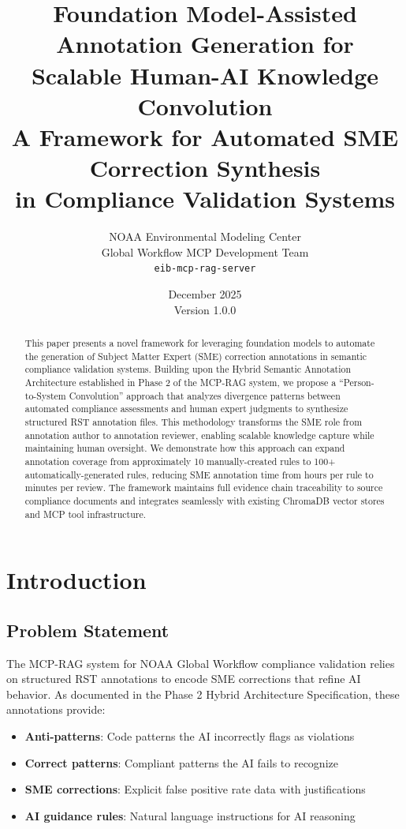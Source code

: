 \documentclass[11pt,a4paper]{article}
\title{%
    \vspace{-1cm}
    \textbf{Foundation Model-Assisted Annotation Generation for\\
    Scalable Human-AI Knowledge Convolution}\\[0.5cm]
    \large A Framework for Automated SME Correction Synthesis\\
    in Compliance Validation Systems
}
\author{
    NOAA Environmental Modeling Center\\
    Global Workflow MCP Development Team\\[0.3cm]
    \texttt{eib-mcp-rag-server}
}
\date{December 2025\\Version 1.0.0}
\begin{document}
\maketitle

\begin{abstract}
This paper presents a novel framework for leveraging foundation models to automate the generation of Subject Matter Expert (SME) correction annotations in semantic compliance validation systems. Building upon the Hybrid Semantic Annotation Architecture established in Phase 2 of the MCP-RAG system, we propose a ``Person-to-System Convolution'' approach that analyzes divergence patterns between automated compliance assessments and human expert judgments to synthesize structured RST annotation files. This methodology transforms the SME role from annotation author to annotation reviewer, enabling scalable knowledge capture while maintaining human oversight. We demonstrate how this approach can expand annotation coverage from approximately 10 manually-created rules to 100+ automatically-generated rules, reducing SME annotation time from hours per rule to minutes per review. The framework maintains full evidence chain traceability to source compliance documents and integrates seamlessly with existing ChromaDB vector stores and MCP tool infrastructure.
\end{abstract}

\section{Introduction}

\subsection{Problem Statement}

The MCP-RAG system for NOAA Global Workflow compliance validation relies on structured RST annotations to encode SME corrections that refine AI behavior. As documented in the Phase 2 Hybrid Architecture Specification, these annotations provide:

\begin{itemize}
    \item \textbf{Anti-patterns}: Code patterns the AI incorrectly flags as violations
    \item \textbf{Correct patterns}: Compliant patterns the AI fails to recognize
    \item \textbf{SME corrections}: Explicit false positive rate data with justifications
    \item \textbf{AI guidance rules}: Natural language instructions for AI reasoning
\end{itemize}
\end{document}
